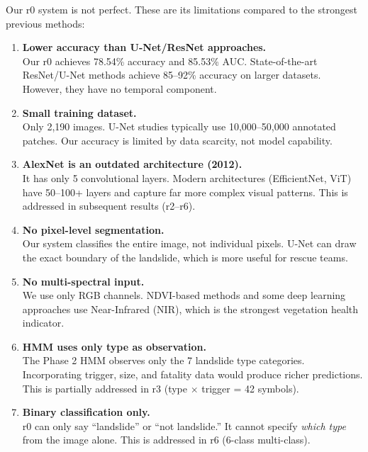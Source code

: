 \documentclass[11pt]{article}
\begin{document}
Our r0 system is not perfect. These are its limitations compared to the strongest previous methods:

\begin{enumerate}
    \item \textbf{Lower accuracy than U-Net/ResNet approaches.}\\
    Our r0 achieves 78.54\% accuracy and 85.53\% AUC. State-of-the-art ResNet/U-Net methods achieve 85--92\% accuracy on larger datasets. However, they have no temporal component.

    \item \textbf{Small training dataset.}\\
    Only 2,190 images. U-Net studies typically use 10,000--50,000 annotated patches. Our accuracy is limited by data scarcity, not model capability.

    \item \textbf{AlexNet is an outdated architecture (2012).}\\
    It has only 5 convolutional layers. Modern architectures (EfficientNet, ViT) have 50--100+ layers and capture far more complex visual patterns. This is addressed in subsequent results (r2--r6).

    \item \textbf{No pixel-level segmentation.}\\
    Our system classifies the entire image, not individual pixels. U-Net can draw the exact boundary of the landslide, which is more useful for rescue teams.

    \item \textbf{No multi-spectral input.}\\
    We use only RGB channels. NDVI-based methods and some deep learning approaches use Near-Infrared (NIR), which is the strongest vegetation health indicator.

    \item \textbf{HMM uses only type as observation.}\\
    The Phase 2 HMM observes only the 7 landslide type categories. Incorporating trigger, size, and fatality data would produce richer predictions. This is partially addressed in r3 (type $\times$ trigger = 42 symbols).

    \item \textbf{Binary classification only.}\\
    r0 can only say ``landslide'' or ``not landslide.'' It cannot specify \emph{which type} from the image alone. This is addressed in r6 (6-class multi-class).
\end{enumerate}
\end{document}

